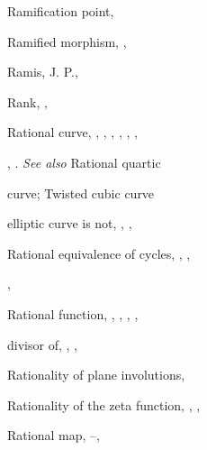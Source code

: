 {{\noindent\hspace*{0.0bp}Ramification point, \par
\noindent\hspace*{0.0bp}Ramified morphism, , \par
\noindent\hspace*{0.0bp}Ramis, J. P., \par
\noindent\hspace*{0.0bp}Rank, , \par
\noindent\hspace*{0.0bp}Rational curve, , , , , , ,\par
\noindent\hspace*{15.0bp}, . \emph{See also} Rational quartic\par
\noindent\hspace*{15.0bp}curve; Twisted cubic curve\par
\noindent\hspace*{7.5bp}elliptic curve is not, , , \par
\noindent\hspace*{0.0bp}Rational equivalence of cycles, , ,\par
\noindent\hspace*{15.0bp}, \par
\noindent\hspace*{0.0bp}Rational function, , , , , \par
\noindent\hspace*{7.5bp}divisor of, , , \par
\noindent\hspace*{0.0bp}Rationality of plane involutions, \par
\noindent\hspace*{0.0bp}Rationality of the zeta function, , ,\par
\noindent\hspace*{15.0bp}\par
\noindent\hspace*{0.0bp}Rational map, --, \par
}}
